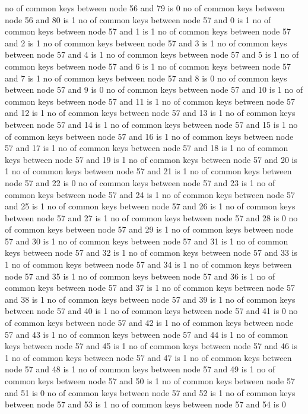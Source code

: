 no of common keys between node 56 and 79 is 0
no of common keys between node 56 and 80 is 1
no of common keys between node 57 and 0 is 1
no of common keys between node 57 and 1 is 1
no of common keys between node 57 and 2 is 1
no of common keys between node 57 and 3 is 1
no of common keys between node 57 and 4 is 1
no of common keys between node 57 and 5 is 1
no of common keys between node 57 and 6 is 1
no of common keys between node 57 and 7 is 1
no of common keys between node 57 and 8 is 0
no of common keys between node 57 and 9 is 0
no of common keys between node 57 and 10 is 1
no of common keys between node 57 and 11 is 1
no of common keys between node 57 and 12 is 1
no of common keys between node 57 and 13 is 1
no of common keys between node 57 and 14 is 1
no of common keys between node 57 and 15 is 1
no of common keys between node 57 and 16 is 1
no of common keys between node 57 and 17 is 1
no of common keys between node 57 and 18 is 1
no of common keys between node 57 and 19 is 1
no of common keys between node 57 and 20 is 1
no of common keys between node 57 and 21 is 1
no of common keys between node 57 and 22 is 0
no of common keys between node 57 and 23 is 1
no of common keys between node 57 and 24 is 1
no of common keys between node 57 and 25 is 1
no of common keys between node 57 and 26 is 1
no of common keys between node 57 and 27 is 1
no of common keys between node 57 and 28 is 0
no of common keys between node 57 and 29 is 1
no of common keys between node 57 and 30 is 1
no of common keys between node 57 and 31 is 1
no of common keys between node 57 and 32 is 1
no of common keys between node 57 and 33 is 1
no of common keys between node 57 and 34 is 1
no of common keys between node 57 and 35 is 1
no of common keys between node 57 and 36 is 1
no of common keys between node 57 and 37 is 1
no of common keys between node 57 and 38 is 1
no of common keys between node 57 and 39 is 1
no of common keys between node 57 and 40 is 1
no of common keys between node 57 and 41 is 0
no of common keys between node 57 and 42 is 1
no of common keys between node 57 and 43 is 1
no of common keys between node 57 and 44 is 1
no of common keys between node 57 and 45 is 1
no of common keys between node 57 and 46 is 1
no of common keys between node 57 and 47 is 1
no of common keys between node 57 and 48 is 1
no of common keys between node 57 and 49 is 1
no of common keys between node 57 and 50 is 1
no of common keys between node 57 and 51 is 0
no of common keys between node 57 and 52 is 1
no of common keys between node 57 and 53 is 1
no of common keys between node 57 and 54 is 0
